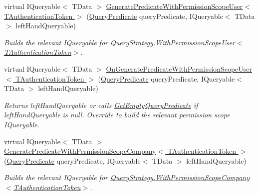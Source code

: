 \begin{DoxyCompactItemize}
virtual I\+Queryable$<$ T\+Data $>$ \hyperlink{classCqrs_1_1Repositories_1_1Queries_1_1QueryBuilder_a027cb88563991a842002c219d7589426_a027cb88563991a842002c219d7589426}{Generate\+Predicate\+With\+Permission\+Scope\+User$<$ T\+Authentication\+Token $>$} (\hyperlink{classCqrs_1_1Repositories_1_1Queries_1_1QueryPredicate}{Query\+Predicate} query\+Predicate, I\+Queryable$<$ T\+Data $>$ left\+Hand\+Queryable)
\begin{DoxyCompactList}\small\item\em Builds the relevant I\+Queryable for \hyperlink{classCqrs_1_1Repositories_1_1Queries_1_1QueryStrategy_ad8b52782f5410a399949417b10820780_ad8b52782f5410a399949417b10820780}{Query\+Strategy.\+With\+Permission\+Scope\+User$<$\+T\+Authentication\+Token$>$}. \end{DoxyCompactList}\item 
virtual I\+Queryable$<$ T\+Data $>$ \hyperlink{classCqrs_1_1Repositories_1_1Queries_1_1QueryBuilder_a314592206fd5d2a25866227cc547dd6b_a314592206fd5d2a25866227cc547dd6b}{On\+Generate\+Predicate\+With\+Permission\+Scope\+User$<$ T\+Authentication\+Token $>$} (\hyperlink{classCqrs_1_1Repositories_1_1Queries_1_1QueryPredicate}{Query\+Predicate} query\+Predicate, I\+Queryable$<$ T\+Data $>$ left\+Hand\+Queryable)
\begin{DoxyCompactList}\small\item\em Returns {\itshape left\+Hand\+Queryable}  or calls \hyperlink{classCqrs_1_1Repositories_1_1Queries_1_1QueryBuilder_a7dc8f0da3bb4ef54b8cbdda6c50ee0a1_a7dc8f0da3bb4ef54b8cbdda6c50ee0a1}{Get\+Empty\+Query\+Predicate} if {\itshape left\+Hand\+Queryable}  is null. Override to build the relevant permission scope I\+Queryable. \end{DoxyCompactList}\item 
virtual I\+Queryable$<$ T\+Data $>$ \hyperlink{classCqrs_1_1Repositories_1_1Queries_1_1QueryBuilder_aa1341909b87629158efa619af12cec5f_aa1341909b87629158efa619af12cec5f}{Generate\+Predicate\+With\+Permission\+Scope\+Company$<$ T\+Authentication\+Token $>$} (\hyperlink{classCqrs_1_1Repositories_1_1Queries_1_1QueryPredicate}{Query\+Predicate} query\+Predicate, I\+Queryable$<$ T\+Data $>$ left\+Hand\+Queryable)
\begin{DoxyCompactList}\small\item\em Builds the relevant I\+Queryable for \hyperlink{classCqrs_1_1Repositories_1_1Queries_1_1QueryStrategy_a822a0901976ceadb3f096326860e3006_a822a0901976ceadb3f096326860e3006}{Query\+Strategy.\+With\+Permission\+Scope\+Company$<$\+T\+Authentication\+Token$>$}. \end{DoxyCompactList}\item 

\end{DoxyCompactItemize}
